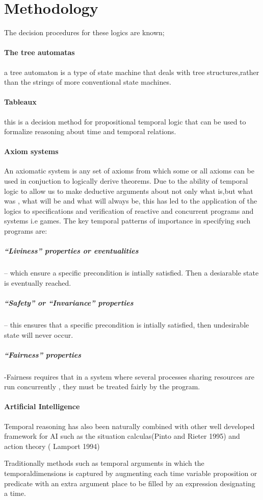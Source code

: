 \documentclass[10pt,a4paper]{report}
\begin{document}
\section{ Methodology}

The decision procedures for these logics are known;
\paragraph{ The tree automatas}
	a tree automaton is a type of state machine that deals with tree structures,rather than the strings of more conventional state machines.
\paragraph{ Tableaux}
	this is a decision method for propositional temporal logic that can be used to formalize reasoning about time and temporal relations.
\paragraph{Axiom systems}
	An axiomatic system is any set of axioms from which some or all axioms can be used in conjuction to logically derive theorems.
Due to the ability of temporal logic to allow us to make deductive arguments about not only what is,but what was , what will be and what will always be, this has led to the application of the logics to specifications and verification of reactive and concurrent programs and systems i.e games.
The key temporal patterns of importance in specifying such programs are:
\subparagraph{“Liviness” properties or eventualities }– which ensure a specific precondition is intially satisfied. Then a desiarable state is eventually reached.
\subparagraph{“Safety” or “Invariance” properties} – this ensures that a specific precondition is intially satisfied, then undesirable state will never occur.
\subparagraph{“Fairness” properties} -Fairness requires that in a system where several processes sharing resources are run concurrently , they must be treated fairly by the program.
\paragraph{Artificial Intelligence}
	Temporal reasoning has also been naturally combined with other well developed framework for AI such as the situation calculas(Pinto and Rieter 1995) and action theory ( Lamport 1994)

Traditionally methods such as temporal arguments in which the temporaldimensions is captured by augmenting each time variable proposition or predicate with an extra argument place to be filled by an expression designating a time.
\end{document}
